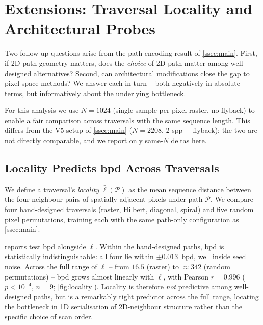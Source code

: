 \documentclass[conference,a4paper]{IEEEtran}
\begin{document}
\section{Extensions: Traversal Locality and Architectural Probes}%
\label{sec:extensions}

Two follow-up questions arise from the path-encoding result of
\cref{ssec:main}. First, if 2D path geometry matters, does the
\emph{choice} of 2D path matter among well-designed alternatives?
Second, can architectural modifications close the gap to
pixel-space methods? We answer each in turn -- both negatively
in absolute terms, but informatively about the underlying
bottleneck.

For this analysis we use $N{=}1024$ (single-sample-per-pixel
raster, no flyback) to enable a fair comparison across traversals
with the same sequence length. This differs from the V5 setup of
\cref{ssec:main} ($N{=}2208$, 2-spp + flyback); the two are not
directly comparable, and we report only same-$N$ deltas here.

\subsection{Locality Predicts bpd Across Traversals}%
\label{ssec:locality}

We define a traversal's \emph{locality} $\bar{\ell}(\mathcal{P})$
as the mean sequence distance between the four-neighbour pairs of
spatially adjacent pixels under path $\mathcal{P}$. We compare
four hand-designed traversals (raster, Hilbert, diagonal, spiral)
and five random pixel permutations, training each with the same
path-only configuration as \cref{ssec:main}.



 reports test bpd alongside $\bar{\ell}$.
Within the hand-designed paths, bpd is statistically
indistinguishable: all four lie within $\pm0.013$~bpd, well
inside seed noise. Across the full range of $\bar{\ell}$ -- from
$16.5$ (raster) to $\approx 342$ (random permutations) -- bpd
grows almost linearly with $\bar{\ell}$, with Pearson $r{=}0.996$
($p<10^{-4}$, $n{=}9$; \cref{fig:locality}). Locality is
therefore \emph{not} predictive among well-designed paths, but is
a remarkably tight predictor across the full range, locating the
bottleneck in 1D serialisation of 2D-neighbour structure rather
than the specific choice of scan order.
\end{document}
